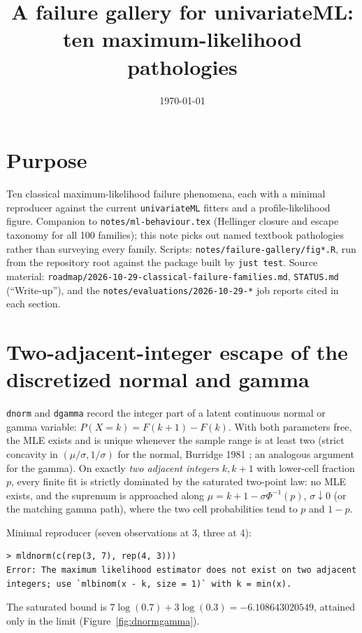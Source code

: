 \documentclass[11pt]{article}
\title{A failure gallery for univariateML: ten maximum-likelihood pathologies}
\author{}
\date{\today}
\newcommand{\code}[1]{\texttt{#1}}
\theoremstyle{plain}
\theoremstyle{definition}
\theoremstyle{remark}
\begin{document}
\maketitle

\section*{Purpose}

Ten classical maximum-likelihood failure phenomena, each with a minimal
reproducer against the current \code{univariateML} fitters and a
profile-likelihood figure. Companion to \code{notes/ml-behaviour.tex}
(Hellinger closure and escape taxonomy for all 100 families); this note
picks out named textbook pathologies rather than surveying every family.
Scripts: \code{notes/failure-gallery/fig*.R}, run from the repository root
against the package built by \code{just test}. Source material:
\code{roadmap/2026-10-29-classical-failure-families.md},
\code{STATUS.md} (``Write-up''), and the \code{notes/evaluations/2026-10-29-*}
job reports cited in each section.

\section{Two-adjacent-integer escape of the discretized normal and gamma}
\label{sec:dnormgamma}

\code{dnorm} and \code{dgamma} record the integer part of a latent
continuous normal or gamma variable: $P(X=k)=F(k+1)-F(k)$. With both
parameters free, the MLE exists and is unique whenever the sample range is
at least two (strict concavity in $(\mu/\sigma,1/\sigma)$ for the normal,
Burridge 1981 \cite{burridge1981}; an analogous argument for the gamma). On
exactly \emph{two adjacent integers} $k,k+1$ with lower-cell fraction $p$,
every finite fit is strictly dominated by the saturated two-point law: no
MLE exists, and the supremum is approached along $\mu=k+1-\sigma\Phi^{-1}(p)$,
$\sigma\downarrow0$ (or the matching gamma path), where the two cell
probabilities tend to $p$ and $1-p$.

Minimal reproducer (seven observations at 3, three at 4):
\begin{verbatim}
> mldnorm(c(rep(3, 7), rep(4, 3)))
Error: The maximum likelihood estimator does not exist on two adjacent
integers; use `mlbinom(x - k, size = 1)` with k = min(x).
\end{verbatim}
The saturated bound is $7\log(0.7)+3\log(0.3)=-6.108643020549$, attained
only in the limit (Figure~\ref{fig:dnormgamma}).
\end{document}
